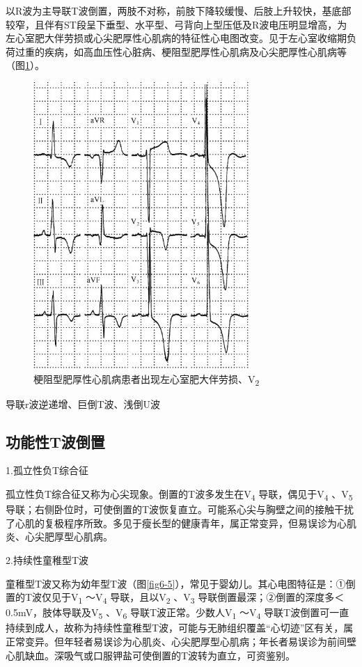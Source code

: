 以R波为主导联T波倒置，两肢不对称，前肢下降较缓慢、后肢上升较快，基底部较窄，且伴有ST段呈下垂型、水平型、弓背向上型压低及R波电压明显增高，为左心室肥大伴劳损或心尖肥厚性心肌病的特征性心电图改变。见于左心室收缩期负荷过重的疾病，如高血压性心脏病、梗阻型肥厚性心肌病及心尖肥厚性心肌病等（图\ref{fig6-4}）。

\begin{figure}[!htbp]
 \centering
 \includegraphics[width=3.22917in,height=4.29167in]{./images/Image00096.jpg}
 \captionsetup{justification=centering}
 \caption{梗阻型肥厚性心肌病患者出现左心室肥大伴劳损、V\textsubscript{2}}
 \label{fig6-4}
  \end{figure} 
导联r波逆递增、巨倒T波、浅倒U波

\protect\hypertarget{text00012.htmlux5cux23subid92}{}{}

\subsection{功能性T波倒置}

1.孤立性负T综合征

孤立性负T综合征又称为心尖现象。倒置的T波多发生在V\textsubscript{4}
导联，偶见于V\textsubscript{4} 、V\textsubscript{5}
导联；右侧卧位时，可使倒置的T波恢复直立。可能系心尖与胸壁之间的接触干扰了心肌的复极程序所致。多见于瘦长型的健康青年，属正常变异，但易误诊为心肌炎、心尖肥厚型心肌病。

2.持续性童稚型T波

童稚型T波又称为幼年型T波（图\ref{fig6-5}），常见于婴幼儿。其心电图特征是：①倒置的T波仅见于V\textsubscript{1}
～V\textsubscript{4} 导联，且以V\textsubscript{2} 、V\textsubscript{3}
导联倒置最深；②倒置的深度多＜0.5mV，肢体导联及V\textsubscript{5}
、V\textsubscript{6} 导联T波正常。少数人V\textsubscript{1}
～V\textsubscript{4}
导联T波倒置可一直持续到成人，故称为持续性童稚型T波，可能与无肺组织覆盖“心切迹”区有关，属正常变异。但年轻者易误诊为心肌炎、心尖肥厚型心肌病；年长者易误诊为前间壁心肌缺血。深吸气或口服钾盐可使倒置的T波转为直立，可资鉴别。

